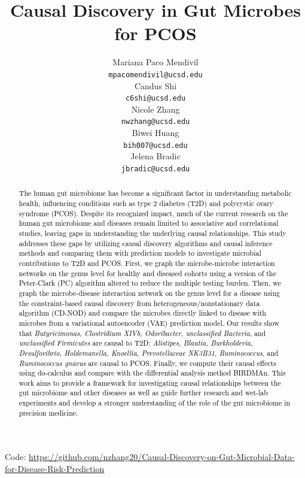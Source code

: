 \documentclass[12pt,letterpaper]{article}
\title{Causal Discovery in Gut Microbes for PCOS}
\author{Mariana Paco Mendivil \\
  {\tt mpacomendivil@ucsd.edu} \\\And
  Candus Shi \\
  {\tt c6shi@ucsd.edu} \\\And
  Nicole Zhang \\
  {\tt nwzhang@ucsd.edu} \\\And
  Biwei Huang \\
  {\tt bih007@ucsd.edu} \\\And
  Jelena Bradic \\
  {\tt jbradic@ucsd.edu}}
\begin{document}
\maketitle



\begin{abstract}
    \textcolor{black}{
    The human gut microbiome has become a significant factor in understanding metabolic health, influencing conditions such as type 2 diabetes (T2D) and polycystic ovary syndrome (PCOS). Despite its recognized impact, much of the current research on the human gut microbiome and diseases remain limited to associative and correlational studies, leaving gaps in understanding the underlying causal relationships. This study addresses these gaps by utilizing causal discovery algorithms and causal inference methods and comparing them with prediction models to investigate microbial contributions to T2D and PCOS. First, we graph the microbe-microbe interaction networks on the genus level for healthy and diseased cohorts using a version of the Peter-Clark (PC) algorithm altered to reduce the multiple testing burden. Then, we graph the microbe-disease interaction network on the genus level for a disease using the constraint-based causal discovery from heterogeneous/nonstationary data algorithm (CD-NOD) and compare the microbes directly linked to disease with microbes from a variational autoencoder (VAE) prediction model. Our results show that \textit{Butyricimonas, Clostridium XIVb, Odoribacter, unclassified Bacteria}, and \textit{unclassified Firmicutes} are causal to T2D; \textit{Alistipes, Blautia, Burkholderia, Desulfovibrio, Holdemanella, Knoellia, Prevotellaceae NK3B31, Ruminococcus}, and \textit{Ruminococcus gnavus} are causal to PCOS. Finally, we compute their causal effects using do-calculus and compare with the differential analysis method BIRDMAn. This work aims to provide a framework for investigating causal relationships between the gut microbiome and other diseases as well as guide further research and wet-lab experiments and develop a stronger understanding of the role of the gut microbiome in precision medicine.}
\end{abstract}

\begin{center}
Code: \url{https://github.com/nzhang20/Causal-Discovery-on-Gut-Microbial-Data-for-Disease-Risk-Prediction}
\end{center}
\end{document}
